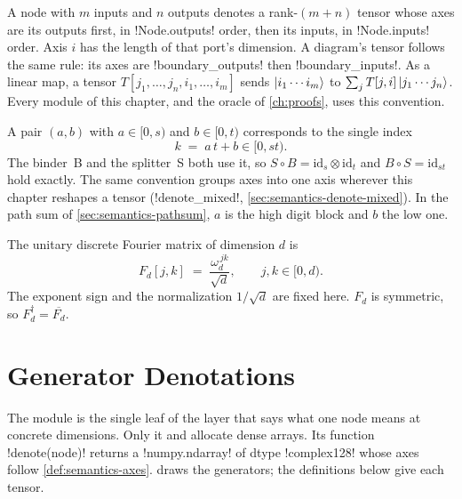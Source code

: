 \begin{definition}\label{def:semantics-axes}
A node with $m$ inputs and $n$ outputs denotes a rank-$(m+n)$ tensor whose axes are its outputs first, in \py!Node.outputs! order, then its inputs, in \py!Node.inputs! order. Axis $i$ has the length of that port's dimension. A diagram's tensor follows the same rule: its axes are \py!boundary_outputs! then \py!boundary_inputs!. As a linear map, a tensor $T[j_1,\dots,j_n,i_1,\dots,i_m]$ sends $\lvert i_1\cdots i_m \rangle$ to $\sum_{j} T[j,i]\,\lvert j_1\cdots j_n \rangle$. Every module of this chapter, and the oracle of \cref{ch:proofs}, uses this convention.
\end{definition}

\begin{definition}\label{def:semantics-pairing}
A pair $(a,b)$ with $a\in[0,s)$ and $b\in[0,t)$ corresponds to the single index
\[
k \;=\; a\,t + b \in [0, st).
\]
The binder~B and the splitter~S both use it, so $S\circ B=\mathrm{id}_{s}\otimes\mathrm{id}_{t}$ and $B\circ S=\mathrm{id}_{st}$ hold exactly. The same convention groups axes into one axis wherever this chapter reshapes a tensor (\py!denote_mixed!, \cref{sec:semantics-denote-mixed}). In the path sum of \cref{sec:semantics-pathsum}, $a$ is the high digit block and $b$ the low one.
\end{definition}

\begin{definition}\label{def:semantics-fourier}
The unitary discrete Fourier matrix of dimension $d$ is
\[
F_d[j,k] \;=\; \frac{\omega_d^{\,jk}}{\sqrt d},\qquad j,k\in[0,d).
\]
The exponent sign and the normalization $1/\sqrt d$ are fixed here. $F_d$ is symmetric, so $F_d^\dagger=\overline{F_d}$.
\end{definition}

\section{Generator Denotations}\label{sec:semantics-denote}

The module  is the single leaf of the layer that says what one node means at concrete dimensions. Only it and  allocate dense arrays. Its function \py!denote(node)! returns a \py!numpy.ndarray! of dtype \py!complex128! whose axes follow \cref{def:semantics-axes}.  draws the generators; the definitions below give each tensor.

